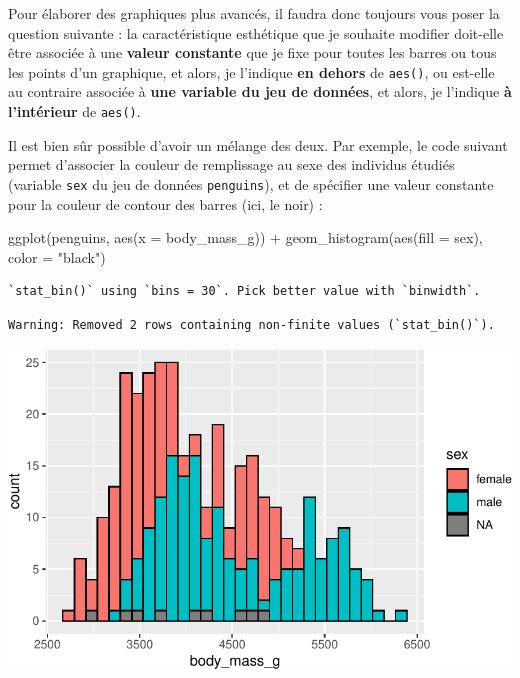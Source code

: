 \documentclass[
  a4paper,
  DIV=11,
  numbers=noendperiod,
  oneside]{scrreprt}
\newenvironment{Shaded}{}{}
\newcommand{\AttributeTok}[1]{\textcolor[rgb]{0.84,0.23,0.29}{#1}}
\newcommand{\FunctionTok}[1]{\textcolor[rgb]{0.44,0.26,0.76}{#1}}
\newcommand{\NormalTok}[1]{\textcolor[rgb]{0.14,0.16,0.18}{#1}}
\newcommand{\SpecialCharTok}[1]{\textcolor[rgb]{0.00,0.36,0.77}{#1}}
\newcommand{\StringTok}[1]{\textcolor[rgb]{0.01,0.18,0.38}{#1}}
\begin{document}
Pour élaborer des graphiques plus avancés, il faudra donc toujours vous
poser la question suivante : la caractéristique esthétique que je
souhaite modifier doit-elle être associée à une \textbf{valeur
constante} que je fixe pour toutes les barres ou tous les points d'un
graphique, et alors, je l'indique \textbf{en dehors} de \texttt{aes()},
ou est-elle au contraire associée à \textbf{une variable du jeu de
données}, et alors, je l'indique \textbf{à l'intérieur} de
\texttt{aes()}.

Il est bien sûr possible d'avoir un mélange des deux. Par exemple, le
code suivant permet d'associer la couleur de remplissage au sexe des
individus étudiés (variable \texttt{sex} du jeu de données
\texttt{penguins}), et de spécifier une valeur constante pour la couleur
de contour des barres (ici, le noir) :

\begin{Shaded}
\begin{Highlighting}[]
\FunctionTok{ggplot}\NormalTok{(penguins, }\FunctionTok{aes}\NormalTok{(}\AttributeTok{x =}\NormalTok{ body\_mass\_g)) }\SpecialCharTok{+}
  \FunctionTok{geom\_histogram}\NormalTok{(}\FunctionTok{aes}\NormalTok{(}\AttributeTok{fill =}\NormalTok{ sex), }\AttributeTok{color =} \StringTok{"black"}\NormalTok{)}
\end{Highlighting}
\end{Shaded}

\begin{verbatim}
`stat_bin()` using `bins = 30`. Pick better value with `binwidth`.
\end{verbatim}

\begin{verbatim}
Warning: Removed 2 rows containing non-finite values (`stat_bin()`).
\end{verbatim}

\includegraphics{03-visualization_files/figure-pdf/unnamed-chunk-12-1.pdf}
\end{document}
